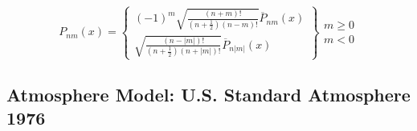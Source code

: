 \documentclass{article}
\begin{document}
\begin{equation}
P_{n m}{\left(x\right)} = \left\{\begin{array}{l}
\left(-1\right)^m \sqrt{\frac{\left(n + m\right)!}{\left(n + \frac{1}{2}\right) \left(n - m\right)!}} \overline{P}_{n m}{\left(x\right)} \\
\sqrt{\frac{\left(n - |m|\right)!}{\left(n + \frac{1}{2}\right) \left(n + |m|\right)!}} \overline{P}_{n |m|}{\left(x\right)}
\end{array}\right\} \begin{array}{l}
m \geq 0 \\
m < 0
\end{array}
\end{equation}

\subsection{Atmosphere Model: U.S. Standard Atmosphere 1976}
\end{document}

